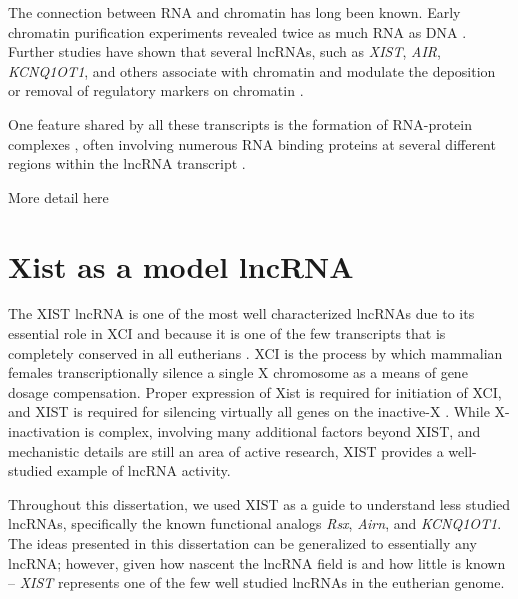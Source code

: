 The connection between RNA and chromatin has long been known. Early chromatin purification experiments revealed twice as much RNA as DNA \cite{Paul1975Chromatin-associatedEuchromatin}. Further studies have shown that several lncRNAs, such as \emph{XIST}, \emph{AIR}, \emph{KCNQ1OT1}, and others associate with chromatin and modulate the deposition or removal of regulatory markers on chromatin \cite{Schertzer2019LncRNA-InducedDNA,Pandey2008Kcnq1ot1Regulation,Sleutels2002TheGenes}. 

One feature shared by all these transcripts is the formation of RNA-protein complexes \cite{Schertzer2019LncRNA-InducedDNA}, often involving numerous RNA binding proteins at several different regions within the lncRNA transcript \cite{Brockdorff2018LocalNcRNA,Nesterova2001CharacterizationSequence,Sprague2019NonlinearDomains,Pintacuda2017HnRNPKSilencing}. 

More detail here

\section{Xist as a model lncRNA}
The XIST lncRNA is one of the most well characterized lncRNAs due to its essential role in XCI and because it is one of the few transcripts that is completely conserved in all eutherians \cite{Brown10TheNucleus.,Brockdorff10TheNucleus.,Sprague2019NonlinearDomains,Kirk2018FunctionalContent}. XCI is the process by which mammalian females transcriptionally silence a single X chromosome as a means of gene dosage compensation. Proper expression of Xist is required for initiation of XCI, and XIST is required for silencing virtually all genes on the inactive-X \cite{Brown10TheNucleus.,Brockdorff10TheNucleus.,Hoki2009AMouse}. While X-inactivation is complex, involving many additional factors beyond XIST, and mechanistic details are still an area of active research, XIST provides a well-studied example of lncRNA activity.


Throughout this dissertation, we used XIST as a guide to understand less studied lncRNAs, specifically the known functional analogs \emph{Rsx}, \emph{Airn}, and \emph{KCNQ1OT1}. The ideas presented in this dissertation can be generalized to essentially any lncRNA; however, given how nascent the lncRNA field is and how little is known -- \emph{XIST} represents one of the few well studied lncRNAs in the eutherian genome.


